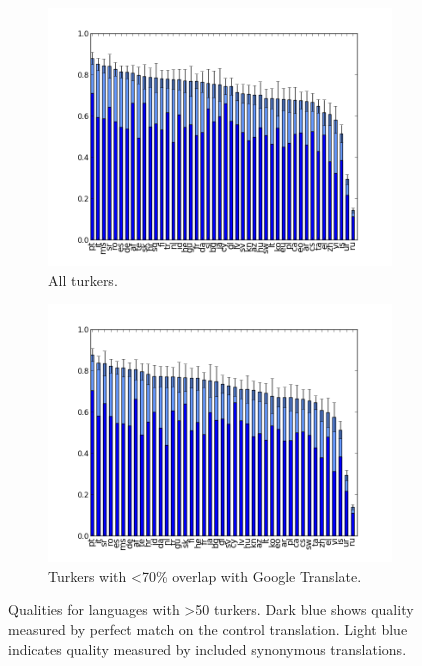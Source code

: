 \documentclass[11pt]{article}
\begin{document}
\begin{figure}
\centering
\begin{subfigure}[b]{1\linewidth}
\includegraphics[width=\textwidth]{figures/quality-all.png}
\caption{All turkers.}                
\label{quality-all}
\end{subfigure}
\begin{subfigure}[b]{1\linewidth}
\includegraphics[width=\textwidth]{figures/quality-filtered.png}
\caption{Turkers with \textless 70\% overlap with Google Translate.}
\label{quality-filtered}
\end{subfigure}
\caption{Qualities for languages with \textgreater 50 turkers. Dark blue shows quality measured by perfect match on the control translation. Light blue indicates quality measured by included synonymous translations.}\label{qual}
\end{figure}
\end{document}
